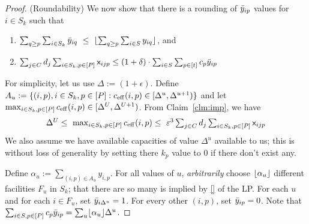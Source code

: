 \begin{proof}
\noindent
(Roundability)
We now show that there is a rounding of $\bar{y}_{ip}$ values for $i\in S_k$ such that
		\begin{enumerate}
			\item $\sum_{q \geq p} \sum_{i\in S_k} \bar{y}_{iq} ~\leq~ \lfloor\sum_{q \geq p}\sum_{i\in S} y_{iq}\rfloor$, and
			\item $\sum_{j\in C} d_j \sum_{i\in S_k,p\in [P]} {\mathsf x}_{ijp} \leq (1+\delta)\cdot \sum_{i\in S} \sum_{p\in [t]} c_p\bar{y}_{ip}$
		\end{enumerate}

\noindent
For simplicity, let us use $\Delta := (1+\epsilon)$.
Define $A_u := \{(i,p), i\in S_k,p\in [P]: c_{\mathrm{eff}}(i,p) \in [\Delta^u,\Delta^{u+1})\}$ and let $\max_{i\in S_k,p\in [P]} c_{\mathrm{eff}}(i,p) \in [\Delta^U,\Delta^{U+1})$.
From Claim~\ref{clm:imp}, we have
\[
\textstyle \Delta^U \leq ~ \max_{i\in S_k,p\in [P]} c_{\mathrm{eff}}(i,p) \leq ~\varepsilon^3 \sum_{j\in C} d_j \sum_{i\in S_k,p\in [P]} {\mathsf x}_{ijp}
\]
We also assume we have available capacities of value $\Delta^u$ available to us; this is without loss of generality by setting there $k_p$ value to $0$
if there don't exist any.

Define $\alpha_u := \sum_{(i,p) \in A_u} y_{i,p}$. For all values of $u$, 
{\em arbitrarily} choose $\lfloor\alpha_u\rfloor$ different facilities $F_u$ in $S_k$; that there are so many is implied by \eqref{} of the LP.
For each $u$ and for each $i\in F_u$, set $\bar{y}_{i\Delta^u} = 1$. For every other $(i,p)$, set $\bar{y}_{ip} = 0$. 
Note that  $\sum_{i\in S,p\in [P]}c_p\bar{y}_{ip} = \sum_u \lfloor\alpha_u\rfloor\Delta^u$.


\end{proof}
